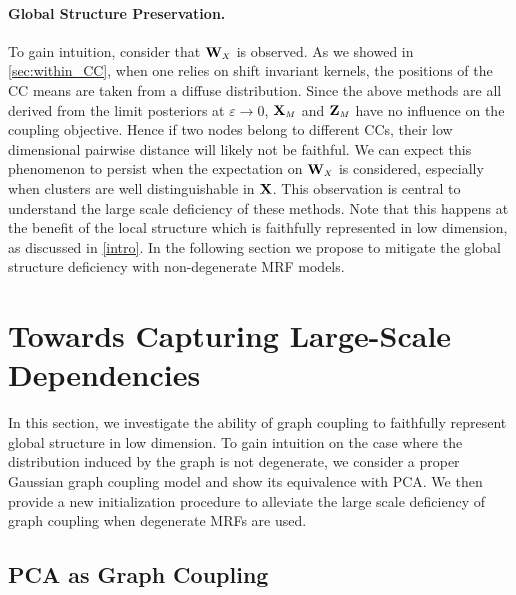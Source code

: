 \paragraph{Global Structure Preservation. }
To gain intuition, consider that $\W_{\scaleto{X}{4pt}}$ is observed. As we showed in \cref{sec:within_CC}, when one relies on shift invariant kernels, the positions of the CC means are taken from a diffuse distribution. Since the above methods are all derived from the limit posteriors at $\varepsilon \to 0$, $\X_{\scaleto{M}{4pt}}$ and $\Z_{\scaleto{M}{4pt}}$ have no influence on the coupling objective. Hence if two nodes belong to different CCs, their low dimensional pairwise distance will likely not be faithful. We can expect this phenomenon to persist when the expectation on $\W_{\scaleto{X}{4pt}}$ is considered, especially when clusters are well distinguishable in $\mathbf{X}$. This observation is central to understand the large scale deficiency of these methods. Note that this happens at the benefit of the local structure which is faithfully represented in low dimension, as discussed in \cref{intro}. In the following section we propose to mitigate the global structure deficiency with non-degenerate MRF models.

\section{Towards Capturing Large-Scale Dependencies}\label{sec:towards_large_scale}

In this section, we investigate the ability of graph coupling to faithfully represent global structure in low dimension. To gain intuition on the case where the distribution induced by the graph is not degenerate, we consider a proper Gaussian graph coupling model and show its equivalence with PCA. We then provide a new initialization procedure to alleviate the large scale deficiency of graph coupling when degenerate MRFs are used.

\subsection{PCA as Graph Coupling}

